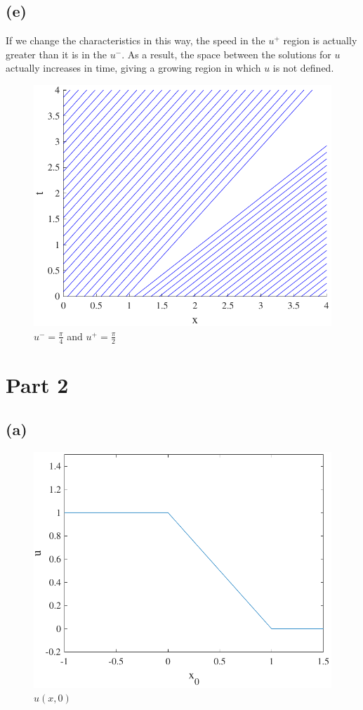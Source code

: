 \documentclass{article}
\begin{document}
\subsection*{(e)}
If we change the characteristics in this way, the speed in the $u^+$ region is actually greater than it is in the $u^-$. As a result, the space between the solutions for $u$ actually increases in time, giving a growing region in which $u$ is not defined. 
\begin{figure}[!htbp]
  \centering
    \includegraphics[width=\textwidth]{hw_14_plot2.pdf}
    \caption{$u^-=\frac{\pi}{4}$ and $u^+=\frac{\pi}{2}$}
\end{figure}
\FloatBarrier
\section*{Part 2}
\subsection*{(a)}
\begin{figure}[!htbp]
  \centering
    \includegraphics[width=\textwidth]{hw_14_plot3.pdf}
    \caption{$u(x, 0)$}
\end{figure}
\FloatBarrier
\end{document}
